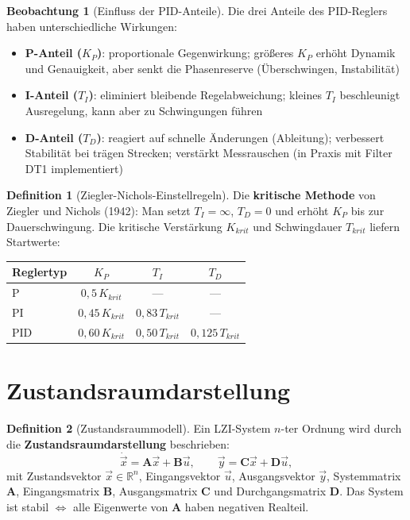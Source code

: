 ﻿\documentclass[a4paper,12pt]{report}
\theoremstyle{definition}
\newtheorem{definition}{Definition}
\newtheorem{beobachtung}{Beobachtung}
\begin{document}
\begin{beobachtung}[Einfluss der PID-Anteile]
Die drei Anteile des PID-Reglers haben unterschiedliche Wirkungen:
\begin{itemize}
    \item[-] \textbf{P-Anteil ($K_P$)}: proportionale Gegenwirkung; 
          gr\"o\ss{}eres $K_P$ erh\"oht Dynamik und Genauigkeit, aber
          senkt die Phasenreserve (\"Uberschwingen, Instabilit\"at)
    \item[-] \textbf{I-Anteil ($T_I$)}: eliminiert bleibende Regelabweichung;
          kleines $T_I$ beschleunigt Ausregelung, kann aber zu Schwingungen f\"uhren
    \item[-] \textbf{D-Anteil ($T_D$)}: reagiert auf schnelle \"Anderungen
          (Ableitung); verbessert Stabilit\"at bei tr\"agen Strecken;
          verst\"arkt Messrauschen (in Praxis mit Filter DT1 implementiert)
\end{itemize}
\end{beobachtung}

\begin{definition}[Ziegler-Nichols-Einstellregeln]
Die \textbf{kritische Methode} von Ziegler und Nichols (1942):
Man setzt $T_I = \infty$, $T_D = 0$ und erh\"oht $K_P$ bis zur
Dauerschwingung. Die kritische Verst\"arkung $K_{krit}$ und Schwingdauer $T_{krit}$
liefern Startwerte:
\begin{center}
\begin{tabular}{lccc}
\toprule
Reglertyp & $K_P$ & $T_I$ & $T_D$ \\
\midrule
P & $0{,}5\,K_{krit}$ & --- & --- \\
PI & $0{,}45\,K_{krit}$ & $0{,}83\,T_{krit}$ & --- \\
PID & $0{,}60\,K_{krit}$ & $0{,}50\,T_{krit}$ & $0{,}125\,T_{krit}$ \\
\bottomrule
\end{tabular}
\end{center}
\end{definition}

\section{Zustandsraumdarstellung}

\begin{definition}[Zustandsraummodell]
Ein LZI-System $n$-ter Ordnung wird durch die
\textbf{Zustandsraumdarstellung} beschrieben:
\[
  \dot{\vec{x}} = \mathbf{A}\vec{x} + \mathbf{B}\vec{u},
  \qquad \vec{y} = \mathbf{C}\vec{x} + \mathbf{D}\vec{u},
\]
mit Zustandsvektor $\vec{x} \in \mathbb{R}^n$, Eingangsvektor $\vec{u}$,
Ausgangsvektor $\vec{y}$, Systemmatrix $\mathbf{A}$,
Eingangsmatrix $\mathbf{B}$, Ausgangsmatrix $\mathbf{C}$
und Durchgangsmatrix $\mathbf{D}$.
Das System ist stabil $\Leftrightarrow$ alle Eigenwerte von $\mathbf{A}$ haben negativen Realteil.
\end{definition}
\end{document}
